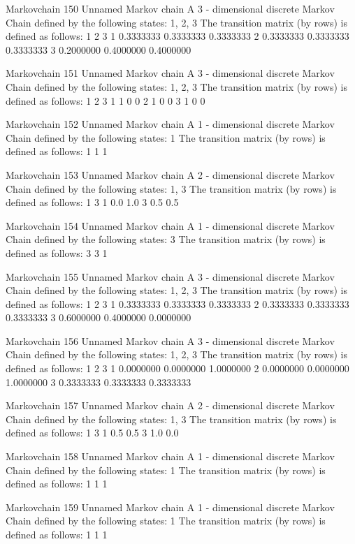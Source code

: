 \documentclass[
  nojss]{jss}
\begin{document}
\begin{CodeChunk}
\begin{CodeOutput}
Markovchain  150 
Unnamed Markov chain 
 A  3 - dimensional discrete Markov Chain defined by the following states: 
 1, 2, 3 
 The transition matrix  (by rows)  is defined as follows: 
          1         2         3
1 0.3333333 0.3333333 0.3333333
2 0.3333333 0.3333333 0.3333333
3 0.2000000 0.4000000 0.4000000

Markovchain  151 
Unnamed Markov chain 
 A  3 - dimensional discrete Markov Chain defined by the following states: 
 1, 2, 3 
 The transition matrix  (by rows)  is defined as follows: 
  1 2 3
1 1 0 0
2 1 0 0
3 1 0 0

Markovchain  152 
Unnamed Markov chain 
 A  1 - dimensional discrete Markov Chain defined by the following states: 
 1 
 The transition matrix  (by rows)  is defined as follows: 
  1
1 1

Markovchain  153 
Unnamed Markov chain 
 A  2 - dimensional discrete Markov Chain defined by the following states: 
 1, 3 
 The transition matrix  (by rows)  is defined as follows: 
    1   3
1 0.0 1.0
3 0.5 0.5

Markovchain  154 
Unnamed Markov chain 
 A  1 - dimensional discrete Markov Chain defined by the following states: 
 3 
 The transition matrix  (by rows)  is defined as follows: 
  3
3 1

Markovchain  155 
Unnamed Markov chain 
 A  3 - dimensional discrete Markov Chain defined by the following states: 
 1, 2, 3 
 The transition matrix  (by rows)  is defined as follows: 
          1         2         3
1 0.3333333 0.3333333 0.3333333
2 0.3333333 0.3333333 0.3333333
3 0.6000000 0.4000000 0.0000000

Markovchain  156 
Unnamed Markov chain 
 A  3 - dimensional discrete Markov Chain defined by the following states: 
 1, 2, 3 
 The transition matrix  (by rows)  is defined as follows: 
          1         2         3
1 0.0000000 0.0000000 1.0000000
2 0.0000000 0.0000000 1.0000000
3 0.3333333 0.3333333 0.3333333

Markovchain  157 
Unnamed Markov chain 
 A  2 - dimensional discrete Markov Chain defined by the following states: 
 1, 3 
 The transition matrix  (by rows)  is defined as follows: 
    1   3
1 0.5 0.5
3 1.0 0.0

Markovchain  158 
Unnamed Markov chain 
 A  1 - dimensional discrete Markov Chain defined by the following states: 
 1 
 The transition matrix  (by rows)  is defined as follows: 
  1
1 1

Markovchain  159 
Unnamed Markov chain 
 A  1 - dimensional discrete Markov Chain defined by the following states: 
 1 
 The transition matrix  (by rows)  is defined as follows: 
  1
1 1


\end{CodeOutput}
\end{CodeChunk}
\end{document}
